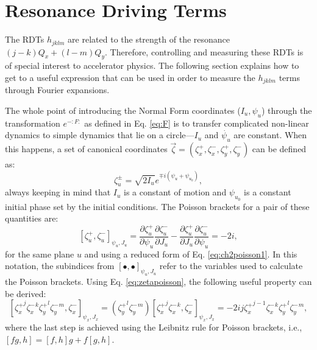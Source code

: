 \section{\label{sec:rdts}Resonance Driving Terms} 

The RDTs $h_{jklm}$ are related to the strength of the resonance $\left( j-k \right) Q_x + \left( l-m\right) Q_y$. Therefore, controlling and measuring these RDTs is of special interest to accelerator physics. The following section explains how to get to a useful expression that can be used in order to measure the $h_{jklm}$ terms through Fourier expansions.

The whole point of introducing the Normal Form coordinates ($I_u,\psi_u$) through the transformation $e^{-:F:}$ as defined in Eq. \ref{eq:F} is to transfer complicated non-linear dynamics to simple dynamics that lie on a circle---$I_u$ and $\dot{\psi_u}$ are constant. When this happens, a set of canonical coordinates $\vec{\zeta} = \left( \zeta_x^+ , \zeta_x^-, \zeta_y^+, \zeta_y^-\right)$ can be defined as:
\begin{equation}
    \label{eq:zeta}
    \zeta_u^{\pm}=\sqrt{2I_u}e^{\mp i\left( \psi_u + \psi_{u_0}\right)},
\end{equation}
always keeping in mind that $I_u$ is a constant of motion and $\psi_{u_0}$ is a constant initial phase set by the initial conditions. The Poisson brackets for a pair of these quantities are:
\begin{equation}
    \label{eq:zetapoisson}
    \left[ \zeta_u^{+}, \zeta_u^{-} \right]_{\psi_u,J_u} = \frac{\partial \zeta_u^{+}}{\partial \psi_u}\frac{\partial \zeta_u^{-}}{\partial J_u} - \frac{\partial \zeta_u^{+}}{\partial J_u}\frac{\partial \zeta_u^{-}}{\partial \psi_u}=-2i,
\end{equation}
for the same plane $u$ and using a reduced form of Eq. \ref{eq:ch2poisson1}. In this notation, the subindices from $[\bullet,\bullet]_{\psi_u,J_u}$ refer to the variables used to calculate the Poisson brackets. Using Eq. \ref{eq:zetapoisson}, the following useful property can be derived:
\begin{equation}
    \label{eq:zetapoisson2}
    \left[ {\zeta_x^{+}}^j {\zeta_x^{-}}^k {\zeta_y^{+}}^l {\zeta_y^{-}}^m, \zeta_x^{-} \right]_{\psi_x,J_x} = \left( {\zeta_y^{+}}^l {\zeta_y^{-}}^m \right)\left[ {\zeta_x^{+}}^j {\zeta_x^{-}}^k, \zeta_x^{-} \right]_{\psi_x,J_x} =-2ij {\zeta_x^{+}}^{j-1} {\zeta_x^{-}}^k {\zeta_y^{+}}^l {\zeta_y^{-}}^m ,
\end{equation}   
where the last step is achieved using the Leibnitz rule for Poisson brackets, i.e., $[fg,h]=[f,h]g+f[g,h]$.

